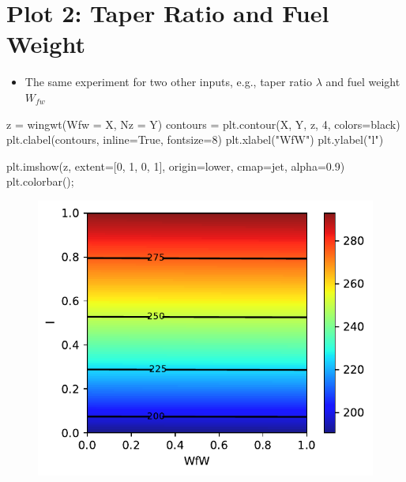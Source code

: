 \documentclass[
  letterpaper,
  DIV=11,
  numbers=noendperiod]{scrreprt}
\newenvironment{Shaded}{\begin{snugshade}}{\end{snugshade}}
\newcommand{\DecValTok}[1]{\textcolor[rgb]{0.68,0.00,0.00}{#1}}
\newcommand{\FloatTok}[1]{\textcolor[rgb]{0.68,0.00,0.00}{#1}}
\newcommand{\NormalTok}[1]{\textcolor[rgb]{0.00,0.23,0.31}{#1}}
\newcommand{\OperatorTok}[1]{\textcolor[rgb]{0.37,0.37,0.37}{#1}}
\newcommand{\StringTok}[1]{\textcolor[rgb]{0.13,0.47,0.30}{#1}}
\newcommand{\VariableTok}[1]{\textcolor[rgb]{0.07,0.07,0.07}{#1}}
\providecommand{\tightlist}{%
  \setlength{\itemsep}{0pt}\setlength{\parskip}{0pt}}\usepackage{longtable,booktabs,array}
\begin{document}
\hypertarget{plot-2-taper-ratio-and-fuel-weight}{%
\section{Plot 2: Taper Ratio and Fuel
Weight}\label{plot-2-taper-ratio-and-fuel-weight}}

\begin{itemize}
\tightlist
\item
  The same experiment for two other inputs, e.g., taper ratio
  \(\lambda\) and fuel weight \(W_{fw}\)
\end{itemize}

\begin{Shaded}
\begin{Highlighting}[]
\NormalTok{z }\OperatorTok{=}\NormalTok{ wingwt(Wfw }\OperatorTok{=}\NormalTok{ X,  Nz }\OperatorTok{=}\NormalTok{ Y)}
\NormalTok{contours }\OperatorTok{=}\NormalTok{ plt.contour(X, Y, z, }\DecValTok{4}\NormalTok{, colors}\OperatorTok{=}\StringTok{\textquotesingle{}black\textquotesingle{}}\NormalTok{)}
\NormalTok{plt.clabel(contours, inline}\OperatorTok{=}\VariableTok{True}\NormalTok{, fontsize}\OperatorTok{=}\DecValTok{8}\NormalTok{)}
\NormalTok{plt.xlabel(}\StringTok{"WfW"}\NormalTok{)}
\NormalTok{plt.ylabel(}\StringTok{"l"}\NormalTok{)}

\NormalTok{plt.imshow(z, extent}\OperatorTok{=}\NormalTok{[}\DecValTok{0}\NormalTok{, }\DecValTok{1}\NormalTok{, }\DecValTok{0}\NormalTok{, }\DecValTok{1}\NormalTok{], origin}\OperatorTok{=}\StringTok{\textquotesingle{}lower\textquotesingle{}}\NormalTok{,}
\NormalTok{           cmap}\OperatorTok{=}\StringTok{\textquotesingle{}jet\textquotesingle{}}\NormalTok{, alpha}\OperatorTok{=}\FloatTok{0.9}\NormalTok{)}
\NormalTok{plt.colorbar()}\OperatorTok{;}
\end{Highlighting}
\end{Shaded}

\begin{figure}[H]

{\centering \includegraphics{002_awwe_files/figure-pdf/cell-7-output-1.pdf}

}

\end{figure}
\end{document}
